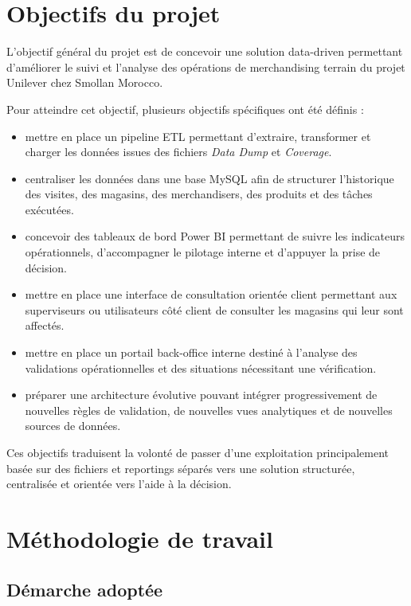 \section{Objectifs du projet}

L’objectif général du projet est de concevoir une solution data-driven permettant d’améliorer le suivi et l’analyse des opérations de merchandising terrain du projet Unilever chez Smollan Morocco.

Pour atteindre cet objectif, plusieurs objectifs spécifiques ont été définis :

\begin{itemize}
\item mettre en place un pipeline ETL permettant d’extraire, transformer et charger les données issues des fichiers \textit{Data Dump} et \textit{Coverage}.
\item centraliser les données dans une base MySQL afin de structurer l’historique des visites, des magasins, des merchandisers, des produits et des tâches exécutées.
\item concevoir des tableaux de bord Power BI permettant de suivre les indicateurs opérationnels, d’accompagner le pilotage interne et d’appuyer la prise de décision.
\item mettre en place une interface de consultation orientée client permettant aux superviseurs ou utilisateurs côté client de consulter les magasins qui leur sont affectés.
\item mettre en place un portail back-office interne destiné à l’analyse des validations opérationnelles et des situations nécessitant une vérification.
\item préparer une architecture évolutive pouvant intégrer progressivement de nouvelles règles de validation, de nouvelles vues analytiques et de nouvelles sources de données.
\end{itemize}

Ces objectifs traduisent la volonté de passer d’une exploitation principalement basée sur des fichiers et reportings séparés vers une solution structurée, centralisée et orientée vers l’aide à la décision.

\section{Méthodologie de travail}

\subsection{Démarche adoptée}


